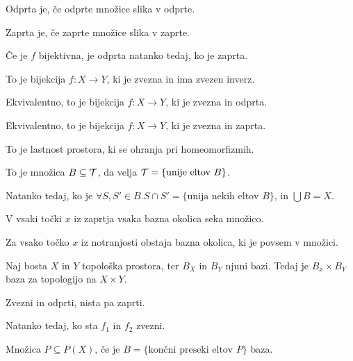 Odprta je, če odprte množice slika v odprte.

Zaprta je, če zaprte množice slika v zaprte.

Če je $f$ bijektivna, je odprta natanko tedaj, ko je zaprta.


To je bijekcija $f:X \to Y$, ki je zvezna in ima zvezen inverz.

Ekvivalentno, to je bijekcija $f: X \to Y$, ki je zvezna in odprta.

Ekvivalentno, to je bijekcija $f: X \to Y$, ki je zvezna in zaprta.


To je lastnost prostora, ki se ohranja pri homeomorfizmih.


To je množica $B \subseteq \mathcal{T}$, da velja $\mathcal{T} = \{ \text{unije eltov $B$} \}$.


Natanko tedaj, ko je $\forall S, S' \in B . S \cap S' =
\{ \text{unija nekih eltov $B$} \}$, in $\bigcup B = X$.


V vsaki točki $x$ iz zaprtja vsaka bazna okolica seka množico.

Za vsako točko $x$ iz notranjosti obstaja bazna okolica, ki je povsem v množici.


Naj bosta $X$ in $Y$ topološka prostora, ter $B_X$ in $B_Y$ njuni bazi.
Tedaj je $B_x \times B_Y$ baza za topologijo na $X \times Y$.


Zvezni in odprti, nista pa zaprti.


Natanko tedaj, ko sta $f_1$ in $f_2$ zvezni.


Množica $P \subseteq P(X)$, če je $B = \{ \text{končni preseki eltov $P$} \}$
baza.


